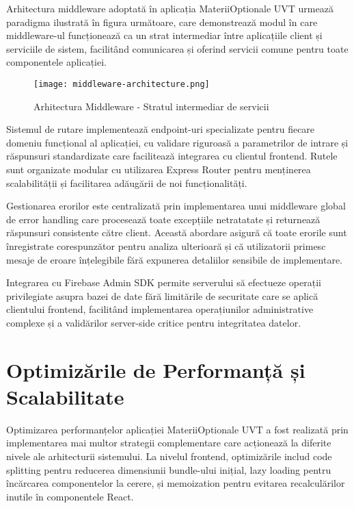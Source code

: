 \documentclass[12pt,a4paper]{report}
\begin{document}
Arhitectura middleware adoptată în aplicația MateriiOptionale UVT urmează paradigma ilustrată în figura următoare, care demonstrează modul în care middleware-ul funcționează ca un strat intermediar între aplicațiile client și serviciile de sistem, facilitând comunicarea și oferind servicii comune pentru toate componentele aplicației.

\begin{figure}[H]
\centering
\texttt{[image: middleware-architecture.png]}
\caption{Arhitectura Middleware - Stratul intermediar de servicii}
\label{fig:middleware-architecture}
\end{figure}

Sistemul de rutare implementează endpoint-uri specializate pentru fiecare domeniu funcțional al aplicației, cu validare riguroasă a parametrilor de intrare și răspunsuri standardizate care facilitează integrarea cu clientul frontend. Rutele sunt organizate modular cu utilizarea Express Router pentru menținerea scalabilității și facilitarea adăugării de noi funcționalități.

Gestionarea erorilor este centralizată prin implementarea unui middleware global de error handling care procesează toate excepțiile netratatate și returnează răspunsuri consistente către client. Această abordare asigură că toate erorile sunt înregistrate corespunzător pentru analiza ulterioară și că utilizatorii primesc mesaje de eroare înțelegibile fără expunerea detaliilor sensibile de implementare.

Integrarea cu Firebase Admin SDK permite serverului să efectueze operații privilegiate asupra bazei de date fără limitările de securitate care se aplică clientului frontend, facilitând implementarea operațiunilor administrative complexe și a validărilor server-side critice pentru integritatea datelor.

\section{Optimizările de Performanță și Scalabilitate}

Optimizarea performanțelor aplicației MateriiOptionale UVT a fost realizată prin implementarea mai multor strategii complementare care acționează la diferite nivele ale arhitecturii sistemului. La nivelul frontend, optimizările includ code splitting pentru reducerea dimensiunii bundle-ului inițial, lazy loading pentru încărcarea componentelor la cerere, și memoization pentru evitarea recalculărilor inutile în componentele React.
\end{document}
